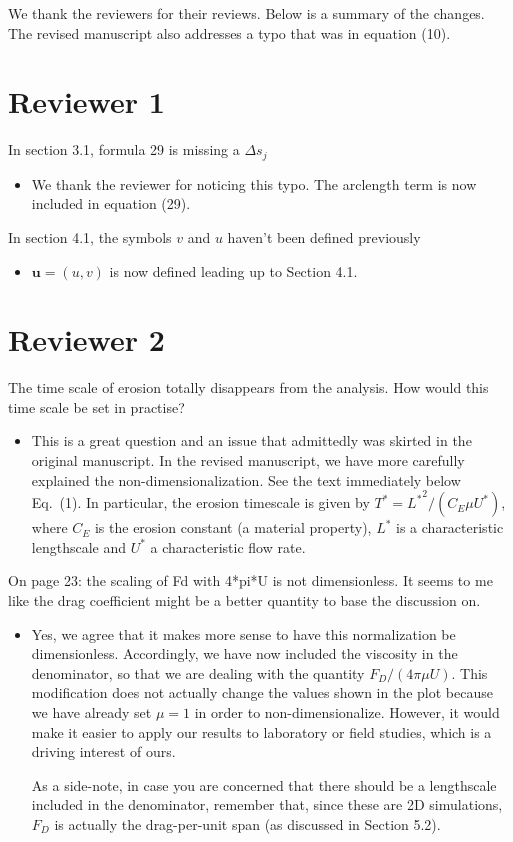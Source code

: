 \documentclass[11pt]{article}
\newcommand{\comment}[1]{{\color{blue} #1}}
\begin{document}
\noindent
We thank the reviewers for their reviews.  Below is a summary of the
changes.  The revised manuscript also addresses a typo that was in
equation (10).

\section*{Reviewer 1}

\noindent
\comment{In section 3.1, formula 29 is missing a $\Delta s_{j}$}
\begin{itemize}
  \item We thank the reviewer for noticing this typo.  The arclength
    term is now included in equation (29).
\end{itemize}

\noindent
\comment{In section 4.1, the symbols $v$ and $u$ haven't been defined
previously}
\begin{itemize}
  \item $\mathbf{u} = (u,v)$ is now defined leading up to Section 4.1.
\end{itemize}



\section*{Reviewer 2}
\noindent
\comment{The time scale of erosion totally disappears from the analysis.
How would this time scale be set in practise?}
\begin{itemize}
\item This is a great question and an issue that admittedly was skirted in the original manuscript. In the revised manuscript, we have more carefully explained the non-dimensionalization. See the text immediately below Eq.~(1). In particular, the erosion timescale is given by $T^* = {L^*}^2/(C_E \mu U^*)$, where $C_E$ is the erosion constant (a material property), $L^*$ is a characteristic lengthscale and $U^*$ a characteristic flow rate.
\end{itemize}

\noindent
\comment{On page 23: the scaling of Fd with 4*pi*U is not dimensionless.
It seems to me like the drag coefficient might be a better quantity to
base the discussion on.}
\begin{itemize}
\item Yes, we agree that it makes more sense to have this normalization be dimensionless.  Accordingly, we have now included the viscosity in the denominator, so that we are dealing with the quantity $F_D /(4 \pi \mu U)$. This modification does not actually change the values shown in the plot because we have already set $\mu =1$ in order to non-dimensionalize. However, it would make it easier to apply our results to laboratory or field studies, which is a driving interest of ours.

As a side-note, in case you are concerned that there should be a lengthscale included in the denominator, remember that, since these are 2D simulations, $F_D$ is actually the drag-per-unit span (as discussed in Section 5.2).
\end{itemize}
\end{document}
